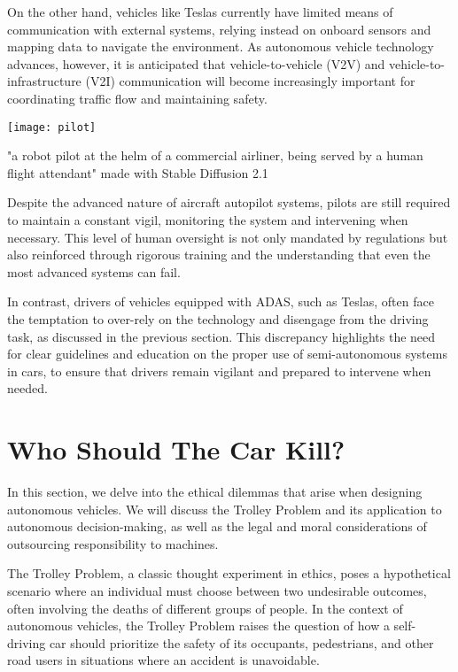 On the other hand, vehicles like Teslas currently have limited means of communication with external systems, relying instead on onboard sensors and mapping data to navigate the environment. As autonomous vehicle technology advances, however, it is anticipated that vehicle-to-vehicle (V2V) and vehicle-to-infrastructure (V2I) communication will become increasingly important for coordinating traffic flow and maintaining safety.

\begin{pdf}
\begin{marginfigure}[-5.5cm]
        \texttt{[image: pilot]}
        \caption{"a robot pilot at the helm of a commercial airliner, being served by a human flight attendant" made with Stable Diffusion 2.1}
\end{marginfigure}
\end{pdf}

Despite the advanced nature of aircraft autopilot systems, pilots are still required to maintain a constant vigil, monitoring the system and intervening when necessary. This level of human oversight is not only mandated by regulations but also reinforced through rigorous training and the understanding that even the most advanced systems can fail.

In contrast, drivers of vehicles equipped with ADAS, such as Teslas, often face the temptation to over-rely on the technology and disengage from the driving task, as discussed in the previous section. This discrepancy highlights the need for clear guidelines and education on the proper use of semi-autonomous systems in cars, to ensure that drivers remain vigilant and prepared to intervene when needed.

\section{Who Should The Car Kill?}

In this section, we delve into the ethical dilemmas that arise when designing autonomous vehicles. We will discuss the Trolley Problem and its application to autonomous decision-making, as well as the legal and moral considerations of outsourcing responsibility to machines.

The Trolley Problem, a classic thought experiment in ethics, poses a hypothetical scenario where an individual must choose between two undesirable outcomes, often involving the deaths of different groups of people. In the context of autonomous vehicles, the Trolley Problem raises the question of how a self-driving car should prioritize the safety of its occupants, pedestrians, and other road users in situations where an accident is unavoidable.


